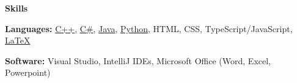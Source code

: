\documentclass[10pt]{article}
\newlength{\headingborderwidth}
\newcommand{\resheading}[1]{
    \begin{mdframed}[
        backgroundcolor=black!15,
        linewidth=\headingborderwidth,
        innertopmargin=4pt,
        innerbottommargin=4pt,
        skipabove=6pt,
        skipbelow=2pt]
        \textbf{\large #1}
    \end{mdframed}
}
\newcommand{\ressubheading}[4]{
    \textbf{#1} \hfill #2 \\[0pt]
    \textit{#3} \hfill #4 \\[0pt]
}
\newenvironment{resitemize}{
    \vspace{-6pt}
    \begin{itemize}
    \setlength\itemsep{-2pt}
}{
    \end{itemize}
}
\begin{document}
\begin{NoHyper}
\begin{resitemize}
    \end{resitemize}


%
%

\resheading{Skills}

\textbf{Languages:}
    \href{https://en.wikipedia.org/wiki/C\%2B\%2B}{C++},
    \href{https://en.wikipedia.org/wiki/C_Sharp_(programming_language)}{C\#},
    \href{https://en.wikipedia.org/wiki/Java_(programming_language)}{Java},
    \href{https://www.python.org/}{Python},
    HTML, CSS, TypeScript/JavaScript,
    \href{https://www.latex-project.org/}{\LaTeX}

\textbf{Software:}
    Visual Studio,
    IntelliJ IDEs,
    Microsoft Office (Word, Excel, Powerpoint)


\end{NoHyper}
\end{document}
